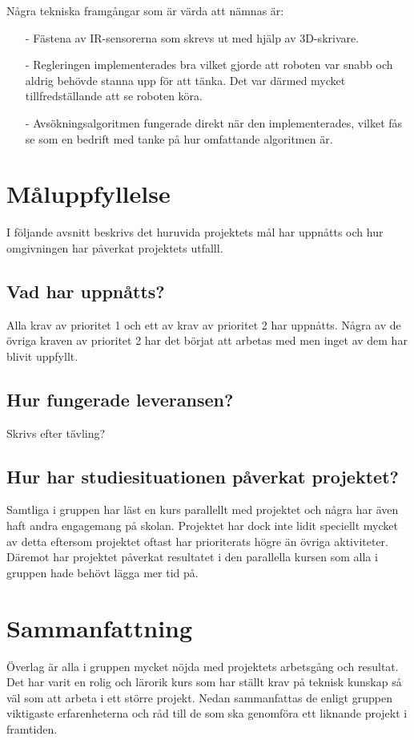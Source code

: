 \documentclass[11pt]{article}
\begin{document}
Några tekniska framgångar som är värda att nämnas är:
\begin{itemize}
  \item[-] Fästena av IR-sensorerna som skrevs ut med hjälp av 3D-skrivare.
  \item[-] Regleringen implementerades bra vilket gjorde att roboten var snabb och aldrig behövde stanna upp för att tänka. Det var därmed mycket tillfredställande att se roboten köra. 
  \item[-] Avsökningsalgoritmen fungerade direkt när den implementerades, vilket fås se som en bedrift med tanke på hur omfattande algoritmen är. 
\end{itemize} 

\pagebreak

\section{Måluppfyllelse}
I följande avsnitt beskrivs det huruvida projektets mål har uppnåtts och hur omgivningen har påverkat projektets utfalll.

\subsection{Vad har uppnåtts?}
Alla krav av prioritet 1 och ett av krav av prioritet 2 har uppnåtts. Några av de övriga kraven av prioritet 2 har det börjat att arbetas med men inget av dem har blivit uppfyllt.

\subsection{Hur fungerade leveransen?}
Skrivs efter tävling?

\subsection{Hur har studiesituationen påverkat projektet?}
Samtliga i gruppen har läst en kurs parallellt med projektet och några har även haft andra engagemang på skolan. Projektet har dock inte lidit speciellt mycket av detta eftersom projektet oftast har prioriterats högre än övriga aktiviteter. Däremot har projektet påverkat resultatet i den parallella kursen som alla i gruppen hade behövt lägga mer tid på. 

 \pagebreak 

\section{Sammanfattning}
Överlag är alla i gruppen mycket nöjda med projektets arbetsgång och resultat. Det har varit en rolig och lärorik kurs som har ställt krav på teknisk kunskap så väl som att arbeta i ett större projekt. Nedan sammanfattas de enligt gruppen viktigaste erfarenheterna och råd till de som ska genomföra ett liknande projekt i framtiden.
\end{document}
